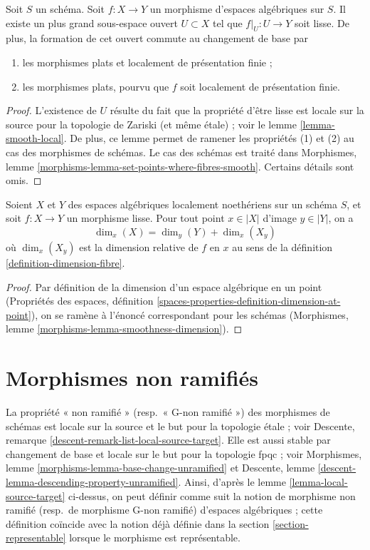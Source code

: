 \begin{lemma}
\label{lemma-where-smooth}
Soit $S$ un schéma. Soit $f : X \to Y$ un morphisme d'espaces
algébriques sur $S$. Il existe un plus grand sous-espace ouvert $U \subset X$
tel que $f|_U : U \to Y$ soit lisse. De plus, la formation de
cet ouvert commute au changement de base par
\begin{enumerate}
\item les morphismes plats et
localement de présentation finie ;
\item les morphismes plats, pourvu que $f$ soit localement de présentation finie.
\end{enumerate}
\end{lemma}

\begin{proof}
L'existence de $U$ résulte du fait que la propriété
d'être lisse est locale sur la source pour la topologie de Zariski (et même étale) ; voir le
lemme \ref{lemma-smooth-local}. De plus, ce lemme permet
de ramener les propriétés (1) et (2) au cas
des morphismes de schémas. Le cas des schémas est traité dans
Morphismes, lemme \ref{morphisms-lemma-set-points-where-fibres-smooth}.
Certains détails sont omis.
\end{proof}

\begin{lemma}
\label{lemma-smoothness-dimension-spaces}
Soient $X$ et $Y$ des espaces algébriques localement noethériens sur un schéma
$S$, et soit $f : X \to Y$ un morphisme lisse.
Pour tout point $x \in |X|$ d'image $y \in |Y|$, on a
$$
\dim_x(X) = \dim_y(Y) + \dim_x(X_y)
$$
où $\dim_x(X_y)$ est la dimension relative de $f$ en $x$ au sens de la
définition \ref{definition-dimension-fibre}.
\end{lemma}

\begin{proof}
Par définition de la dimension d'un espace algébrique
en un point (Propriétés des espaces, définition
\ref{spaces-properties-definition-dimension-at-point}),
on se ramène à l'énoncé correspondant pour les schémas
(Morphismes, lemme \ref{morphisms-lemma-smoothness-dimension}).
\end{proof}



\section{Morphismes non ramifiés}
\label{section-unramified}

\noindent
La propriété « non ramifié » (resp.\ « G-non ramifié »)
des morphismes de schémas est locale sur la source et le but pour la topologie étale ; voir
Descente, remarque \ref{descent-remark-list-local-source-target}.
Elle est aussi stable par changement de base et locale sur le but pour la topologie fpqc ; voir
Morphismes, lemme \ref{morphisms-lemma-base-change-unramified} et
Descente, lemme \ref{descent-lemma-descending-property-unramified}.
Ainsi, d'après le
lemme \ref{lemma-local-source-target}
ci-dessus, on peut définir comme suit la notion de morphisme non ramifié
(resp.\ de morphisme G-non ramifié) d'espaces algébriques ;
cette définition coïncide avec la notion déjà définie dans la
section \ref{section-representable}
lorsque le morphisme est représentable.

